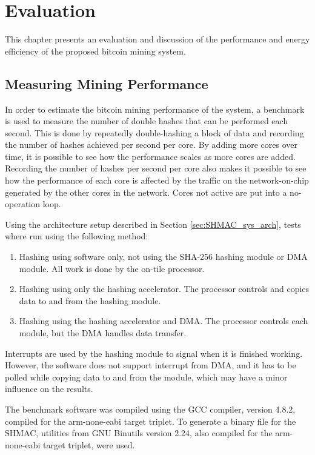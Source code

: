 \chapter{Evaluation}

This chapter presents an evaluation and discussion of the performance and energy efficiency
of the proposed bitcoin mining system.

\section{Measuring Mining Performance}

In order to estimate the bitcoin mining performance of the system, a benchmark is used to
measure the number of double hashes that can be performed each second.
This is done by repeatedly double-hashing a block of data and recording the
number of hashes achieved per second per core. By adding more cores over time, it
is possible to see how the performance scales as more cores are added. Recording
the number of hashes per second per core also makes it possible to see how the performance
of each core is affected by the traffic on the network-on-chip generated by the other
cores in the network. Cores not active are put into a no-operation loop.

Using the architecture setup described in Section \ref{sec:SHMAC_sys_arch}, tests where run using the
following method:

\begin{enumerate}
    \item Hashing using software only, not using the SHA-256 hashing module or DMA module.
    All work is done by the on-tile processor.
    \item Hashing using only the hashing accelerator.
    The processor controls and copies data to and from the hashing module.
    \item Hashing using the hashing accelerator and DMA.
    The processor controls each module, but the DMA handles data transfer.
\end{enumerate}

Interrupts are used by the hashing module to signal when it is finished working. However,
the software does not support interrupt from DMA, and it has to be polled while copying data to and from
the module, which may have a minor influence on the results.

The benchmark software was compiled using the GCC compiler, version 4.8.2, compiled for
the arm-none-eabi target triplet. To generate a binary file for the SHMAC, utilities
from GNU Binutils version 2.24, also compiled for the arm-none-eabi target triplet,
were used.

